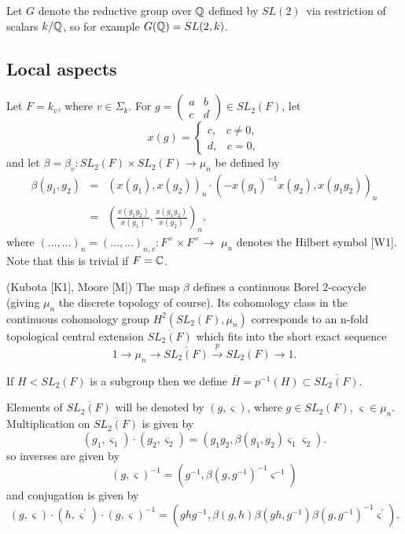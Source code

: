 Let $G$ denote the reductive group over ${\Bbb{Q}}$ defined by $SL(2)$\ via
restriction of scalars $k/{\Bbb{Q}}$, so for example $G({\Bbb{Q}})=SL(2,k)$.

\subsection{Local aspects}

Let $F=k_v$, where $v\in \Sigma _k$. For $g=\left( 
\begin{array}{cc}
a & b \\ 
c & d
\end{array}
\right) \in SL_2(F)$, let 
\[
x(g)=\left\{ 
\begin{array}{c}
c,\;\;\;c\neq 0, \\ 
d,\;\;\;c=0,
\end{array}
\right. 
\]
and let $\beta =\beta _v:SL_2(F)\times SL_2(F)\rightarrow \mu _n$ be defined
by 
\begin{eqnarray*}
\beta (g_1,g_2) &=&(x(g_1),x(g_2))_n\cdot (-x(g_1)^{-1}x(g_2),x(g_1g_2))_n \\
&=&(\frac{x(g_1g_2)}{x(g_1)},\frac{x(g_1g_2)}{x(g_2)})_n,
\end{eqnarray*}
where $(...,...)_n=(...,...)_{n,v}:F^{\times }\times F^{\times }\rightarrow $
$\mu _n$ denotes the Hilbert symbol [W1]. Note that this is trivial if $F=%
{\Bbb{C}}$.

\begin{lemma}
(Kubota [K1], Moore [M]) The map $\beta $ defines a continuous Borel
2-cocycle (giving $\mu _n$ the discrete topology of course). Its cohomology
class in the continuous cohomology group $H^2(SL_2(F),\mu _n)$ corresponds
to an n-fold topological central extension $\overline{SL_2(F)}$ which fits
into the short exact sequence 
\[
1\rightarrow \mu _n\rightarrow \overline{SL_2(F)}\stackrel{p}{\rightarrow }%
SL_2(F)\rightarrow 1.
\]
\end{lemma}

If $H<SL_2(F)$ is a subgroup then we define $\overline{H}=p^{-1}(H)\subset 
\overline{SL_2(F)}$.

Elements of $\overline{SL_2(F)}$ will be denoted by $(g,\varsigma )$, 
where $g\in SL_2(F)$, $\varsigma \in \mu _n$. Multiplication on 
$\overline{SL_2(F)}$ is given by 
\begin{equation}
(g_1,\varsigma _1)\cdot (g_2,\varsigma _2)=(g_1g_2,\beta (g_1,g_2)\varsigma
_1\varsigma _2).
\end{equation}
so inverses are given by 
\begin{equation}
(g,\varsigma )^{-1}=(g^{-1},\beta (g,g^{-1})^{-1}\varsigma ^{-1})
\end{equation}
and conjugation is given by 
\begin{equation}
(g,\varsigma )\cdot (h,\varsigma ^{\prime })\cdot (g,\varsigma
)^{-1}=(ghg^{-1},\beta (g,h)\beta(gh,g^{-1})
\beta (g,g^{-1})^{-1}\varsigma ^{\prime }).
\end{equation}

